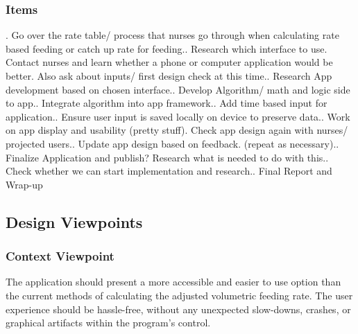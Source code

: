 \documentclass[onecolumn, draftclsnofoot,10pt, compsoc]{IEEEtran}
\begin{document}
\subsubsection{Items}. Go over the rate table/ process that nurses go through when calculating rate based feeding or catch up rate for feeding.. Research which interface to use. Contact nurses and learn whether a phone or computer application would be better. Also ask about inputs/ first design check at this time.. Research App development based on chosen interface.. Develop Algorithm/ math and logic side to app.. Integrate algorithm into app framework.. Add time based input for application.. Ensure user input is saved locally on device to preserve data.. Work on app display and usability (pretty stuff). Check app design again with nurses/ projected users.. Update app design based on feedback. (repeat as necessary).. Finalize Application and publish? Research what is needed to do with this.. Check whether we can start implementation and research.. Final Report and Wrap-up\newline



\subsection{Design Viewpoints}
\subsubsection{Context Viewpoint}
The application should present a more accessible and easier to use option than the current methods of calculating the adjusted volumetric feeding rate.
The user experience should be hassle-free, without any unexpected slow-downs, crashes, or graphical artifacts within the program's control.
\end{document}
